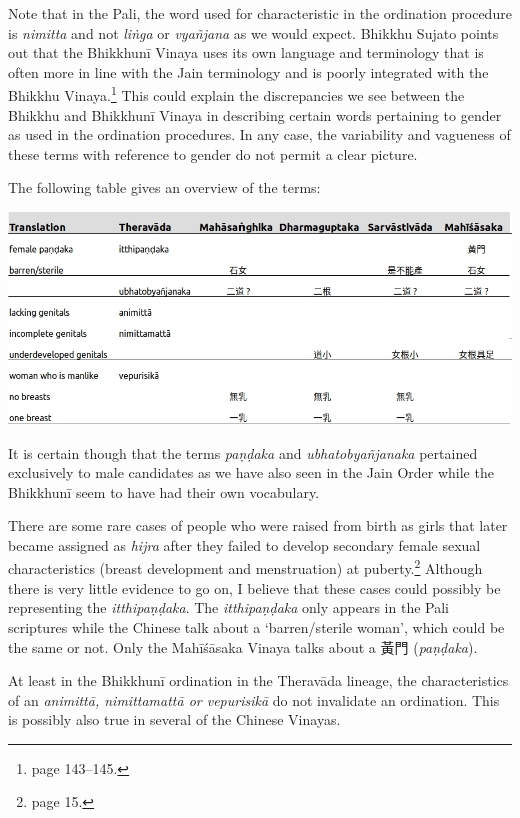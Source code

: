 Note that in the Pali, the word used for characteristic in the ordination procedure is {\em nimitta} and not {\em liṅga} or {\em vyañ­jana} as we would expect. Bhikkhu Sujato points out that the Bhikkhunī Vinaya uses its own language and terminology that is often more in line with the Jain terminology and is poorly integrated with the Bhikkhu Vinaya.\footnote{\cite{sujato2009} page 143–145.} This could explain the discrepancies we see between the Bhikkhu and Bhikkhunī Vinaya in describing certain words pertaining to gender as used in the ordination procedures. In any case, the variability and vagueness of these terms with reference to gender do not permit a clear picture. 

The following table gives an overview of the terms:

\bigskip
\includegraphics[width=\linewidth]{female.jpg}
\label{female}

It is certain though that the terms {\em paṇḍaka} and {\em ubhatob­yañ­janaka} pertained exclusively to male candidates as we have also seen in the Jain Order while the Bhikkhunī seem to have had their own vocabulary.

There are some rare cases of people who were raised from birth as girls that later became assigned as {\em hijra} after they failed to develop secondary female sexual characteristics (breast development and menstruation) at puberty.\footnote{\cite{nanda} page 15.} Although there is very little evidence to go on, I believe that these cases could possibly be representing the {\em itthipaṇḍaka}. The {\em itthipaṇḍaka} only appears in the Pali scriptures while the Chinese talk about a `barren/sterile woman', which could be the same or not. Only the Mahīśāsaka Vinaya talks about a 黃門 ({\em paṇḍaka}). 

At least in the Bhikkhunī ordination in the Theravāda lineage, the characteristics of an {\em animittā, nimittamattā or vepurisikā} do not invalidate an ordination. This is possibly also true in several of the Chinese Vinayas.
